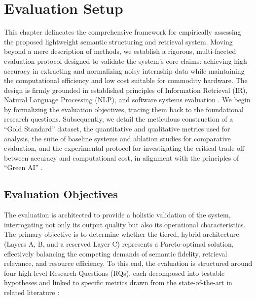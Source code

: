 \chapter{Evaluation Setup}
This chapter delineates the comprehensive framework for empirically assessing the proposed lightweight semantic structuring and retrieval system. Moving beyond a mere description of methods, we establish a rigorous, multi-faceted evaluation protocol designed to validate the system's core claims: achieving high accuracy in extracting and normalizing noisy internship data while maintaining the computational efficiency and low cost suitable for commodity hardware. The design is firmly grounded in established principles of Information Retrieval (IR), Natural Language Processing (NLP), and software systems evaluation \cite{manning2008introduction, buttcher2016information, jurafsky2023speech}. We begin by formalizing the evaluation objectives, tracing them back to the foundational research questions. Subsequently, we detail the meticulous construction of a ``Gold Standard'' dataset, the quantitative and qualitative metrics used for analysis, the suite of baseline systems and ablation studies for comparative evaluation, and the experimental protocol for investigating the critical trade-off between accuracy and computational cost, in alignment with the principles of ``Green AI'' \cite{schwartz2020green}.

\section{Evaluation Objectives}
The evaluation is architected to provide a holistic validation of the system, interrogating not only its output quality but also its operational characteristics. The primary objective is to determine whether the tiered, hybrid architecture (Layers A, B, and a reserved Layer C) represents a Pareto-optimal solution, effectively balancing the competing demands of semantic fidelity, retrieval relevance, and resource efficiency. To this end, the evaluation is structured around four high-level Research Questions (RQs), each decomposed into testable hypotheses and linked to specific metrics drawn from the state-of-the-art in related literature \cite{li2020survey, menghani2023efficient, thakur2021beir}:

